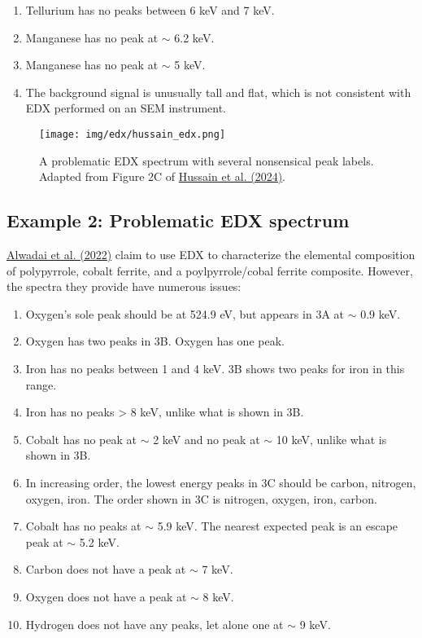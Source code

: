 \documentclass[letterpaper, 12pt]{article}
\begin{document}
\begin{enumerate}
    \setlength\itemsep{-0.5em}
    \item Tellurium has no peaks between 6 keV and 7 keV.
    \item Manganese has no peak at $\sim$ 6.2 keV.
    \item Manganese has no peak at $\sim$ 5 keV.
    \item The background signal is unusually tall and flat, which is not consistent with EDX performed on an SEM instrument.
\end{enumerate}

\begin{figure}[h!tbp]
    \texttt{[image: img/edx/hussain\_edx.png]}
    \caption*{ A problematic EDX spectrum with several nonsensical peak labels. Adapted from Figure 2C of \href{https://doi.org/10.1016/j.ijhydene.2024.05.274}{Hussain et al. (2024)}.}
\end{figure}

\pagebreak

\subsection*{Example 2: Problematic EDX spectrum}

\href{https://doi.org/10.1007/s10854-022-08265-y}{Alwadai et al. (2022)} claim to use EDX to characterize the elemental composition of polypyrrole, cobalt ferrite, and a poylpyrrole/cobal ferrite composite. However, the spectra they provide have numerous issues:

\begin{enumerate}
    \setlength\itemsep{-0.5em}
    \item Oxygen's sole peak should be at 524.9 eV, but appears in 3A at $\sim$ 0.9 keV.
    \item Oxygen has two peaks in 3B. Oxygen has one peak.
    \item Iron has no peaks between 1 and 4 keV. 3B shows two peaks for iron in this range.
    \item Iron has no peaks > 8 keV, unlike what is shown in 3B.
    \item Cobalt has no peak at $\sim$ 2 keV and no peak at $\sim$ 10 keV, unlike what is shown in 3B.
    \item In increasing order, the lowest energy peaks in 3C should be carbon, nitrogen, oxygen, iron. The order shown in 3C is nitrogen, oxygen, iron, carbon.
    \item Cobalt has no peaks at $\sim$ 5.9 keV. The nearest expected peak is an escape peak at $\sim$ 5.2 keV.
    \item Carbon does not have a peak at $\sim$ 7 keV.
    \item Oxygen does not have a peak at $\sim$ 8 keV.
    \item Hydrogen does not have any peaks, let alone one at $\sim$ 9 keV.
\end{enumerate}
\end{document}
